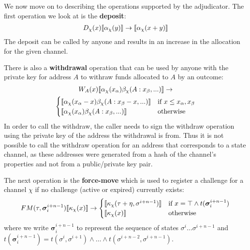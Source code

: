 We now move on to describing the operations supported by the adjudicator. The first operation we look at is the \textbf{deposit}:
\begin{align*}
D_\chi(x) \llbracket \alpha_\chi(y) \rrbracket \rightarrow \llbracket \alpha_\chi(x + y) \rrbracket
\end{align*}
The deposit can be called by anyone and results in an increase in the allocation for the given channel.

There is also a \textbf{withdrawal} operation that can be used by anyone with the private key for address $A$ to withraw funds allocated to $A$ by an outcome:
\begin{multline*}
W_A(x) \llbracket \alpha_\chi(x_\alpha)\beta_\chi(A: x_\beta, ...) \rrbracket \rightarrow \\
\begin{cases}
  \llbracket \alpha_\chi(x_\alpha - x)\beta_\chi(A: x_\beta - x, ...) \rrbracket &
  \text{if } x \leq x_\alpha, x_\beta  \\
  \llbracket \alpha_\chi(x_\alpha)\beta_\chi(A: x_\beta, ...) \rrbracket &
  \text{otherwise}
\end{cases}
\end{multline*}
In order to call the withdraw, the caller needs to sign the withdraw operation using the private key of the address the withdrawal is from. Thus it is not possible to call the withdraw operation for an address that corresponds to a state channel, as these addresses were generated from a hash of the channel's properties and not from a public/private key pair.

The next operation is the \textbf{force-move} which is used to register a challenge for a channel $\chi$ if no challenge (active or expired) currently exists:
\begin{align*}
FM(\tau, \bm{\sigma}_i^{i+n-1}) \llbracket \kappa_\chi(x) \rrbracket \rightarrow 
\begin{cases}
  \llbracket \kappa_\chi(\tau + \eta, \sigma^{i+n-1}) \rrbracket &
  \text{if } x = \top \wedge t(\bm{\sigma}_i^{i+n-1}) \\
  \llbracket \kappa_\chi(x) \rrbracket &
  \text{otherwise}
\end{cases}
\end{align*}
where we write $\bm{\sigma}_i^{i+n-1}$ to represent the sequence of states $\sigma^i \dots \sigma^{i+n-1}$ and $t(\bm{\sigma}_i^{i+n-1}) = t(\sigma^{i}, \sigma^{i+1}) \wedge \dots \wedge t(\sigma^{i+n-2}, \sigma^{i+n-1})$.

